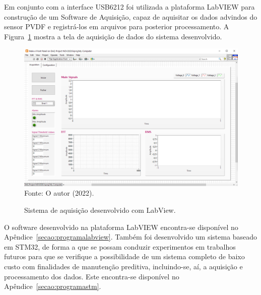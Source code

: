 \documentclass[
	12pt,				
	oneside,			
	a4paper,			
	english,			
	brazil,			
	]{abntex2ppgsi}
\begin{document}
Em conjunto com a interface USB6212 foi utilizada a plataforma LabVIEW para construção de um Software de Aquisição, capaz de aquisitar os dados advindos do sensor PVDF e registrá-los em arquivos para posterior processamento. A Figura~\ref{sistema_labview} mostra a tela de aquisição de dados do sistema desenvolvido. 

\begin{figure}[H]
\centering
\caption {Sistema de aquisição desenvolvido com LabView.}
\includegraphics[width=\textwidth,height=\textheight,keepaspectratio]{sistema_labview} \\
Fonte: O autor (2022).
\label{sistema_labview}
\end{figure} 

O software desenvolvido na plataforma LabVIEW encontra-se disponível no Apêndice~\ref{secao:programalabview}. Também foi desenvolvido um sistema baseado em STM32, de forma a que se possam conduzir experimentos em trabalhos futuros para que se verifique a possibilidade de um sistema completo de baixo custo com finalidades de manutenção preditiva, incluindo-se, aí, a aquisição e processamento dos dados. Este encontra-se disponível no Apêndice~\ref{secao:programastm}.

\end{document}
